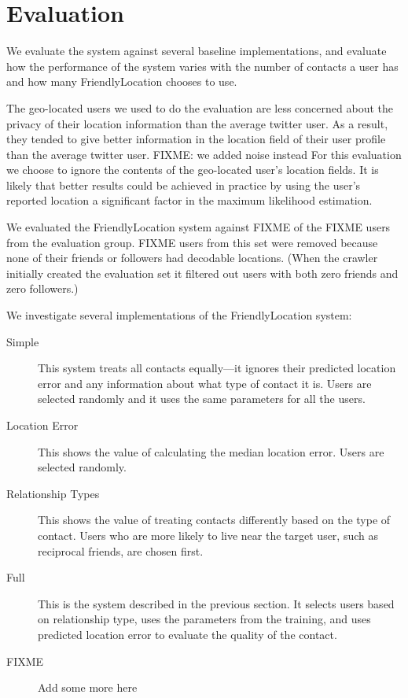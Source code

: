 
\section{Evaluation}
We evaluate the system against several baseline implementations, and evaluate
how the performance of the system varies with the number of contacts a user has
and how many FriendlyLocation chooses to use.

The geo-located users we used to do the evaluation are less concerned about the
privacy of their location information than the average twitter user.
As a result, they tended to give better information in the location field of
their user profile than the average twitter user.
FIXME: we added noise instead
For this evaluation we choose to ignore the contents of the geo-located user's
location fields.
It is likely that better results could be achieved in practice
by using the user's reported location a significant factor in the maximum
likelihood estimation.

We evaluated the FriendlyLocation system against FIXME of the FIXME users from
the evaluation group.
FIXME users from this set were removed because none of their friends or
followers had decodable locations.
(When the crawler initially created the evaluation set it filtered out users
with both zero friends and zero followers.)

We investigate several implementations of the FriendlyLocation system:
\begin{description}
\item[Simple] This system treats all contacts equally---it ignores their
predicted location error and any information about what type of contact it is.
Users are selected randomly and it uses the same parameters for all the users.
\item[Location Error] This shows the value of calculating the median location
error. Users are selected randomly.
\item[Relationship Types] This shows the value of treating contacts differently
based on the type of contact.
Users who are more likely to live near the target user, such as reciprocal
friends, are chosen first.
\item[Full] This is the system described in the previous section. It selects
users based on relationship type, uses the parameters from the training, and
uses predicted location error to evaluate the quality of the contact.
\item[FIXME] Add some more here
\end{description}

